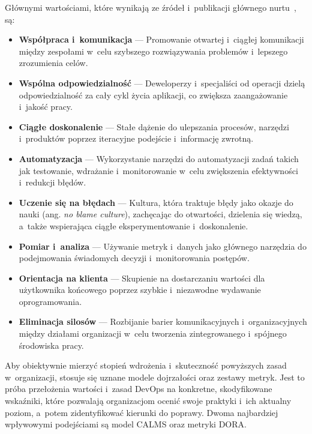 Głównymi wartościami, które wynikają ze źródeł i~publikacji głównego nurtu~\cite{Kim2021DevOpsHandbook,Leite2019DevOpsConcepts}, są:
\begin{itemize}[font=\bfseries]
    \item \textbf{Współpraca i~komunikacja} --- Promowanie otwartej i~ciągłej komunikacji między zespołami w~celu szybszego rozwiązywania problemów i~lepszego zrozumienia celów.
    \item \textbf{Wspólna odpowiedzialność} --- Deweloperzy i~specjaliści od operacji dzielą odpowiedzialność za cały cykl życia aplikacji, co zwiększa zaangażowanie i~jakość pracy.
    \item \textbf{Ciągłe doskonalenie} --- Stałe dążenie do ulepszania procesów, narzędzi i~produktów poprzez iteracyjne podejście i~informację zwrotną.
    \item \textbf{Automatyzacja} --- Wykorzystanie narzędzi do automatyzacji zadań takich jak testowanie, wdrażanie i~monitorowanie w~celu zwiększenia efektywności i~redukcji błędów.
    \item \textbf{Uczenie się na błędach} --- Kultura, która traktuje błędy jako okazje do nauki (ang. \textit{no blame culture}), zachęcając do otwartości, dzielenia się wiedzą, a~także wspierająca ciągłe eksperymentowanie i~doskonalenie.
    \item \textbf{Pomiar i~analiza} --- Używanie metryk i~danych jako głównego narzędzia do podejmowania świadomych decyzji i~monitorowania postępów.
    \item \textbf{Orientacja na klienta} --- Skupienie na dostarczaniu wartości dla użytkownika końcowego poprzez szybkie i~niezawodne wydawanie oprogramowania.
    \item \textbf{Eliminacja silosów} --- Rozbijanie barier komunikacyjnych i~organizacyjnych między działami organizacji w~celu tworzenia zintegrowanego i~spójnego środowiska pracy.
\end{itemize}

Aby obiektywnie mierzyć stopień wdrożenia i~skuteczność powyższych zasad w~organizacji, stosuje się uznane modele dojrzałości oraz zestawy metryk.
Jest to próba przełożenia wartości i~zasad DevOps na konkretne, skodyfikowane wskaźniki, które pozwalają organizacjom ocenić swoje praktyki i~ich aktualny poziom, a~potem zidentyfikować kierunki do poprawy.
Dwoma najbardziej wpływowymi podejściami są model CALMS oraz metryki DORA.

